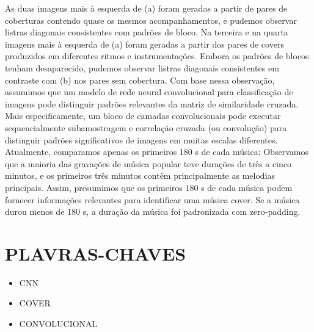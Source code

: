 \documentclass{article}
\begin{document}
As duas imagens mais à esquerda de (a) foram geradas a partir de pares de coberturas contendo quase os mesmos acompanhamentos, e pudemos observar listras diagonais consistentes com padrões de bloco. 
Na terceira e na quarta imagens mais à esquerda de (a) foram geradas a partir dos pares de covers produzidos em diferentes ritmos e instrumentações. 
Embora os padrões de blocos tenham desaparecido, pudemos observar listras diagonais consistentes em contraste com (b) nos pares sem cobertura. 
Com base nessa observação, assumimos que um modelo de rede neural convolucional para classificação de imagens pode distinguir padrões relevantes da matriz de similaridade cruzada. 
Mais especificamente, um bloco de camadas convolucionais pode executar sequencialmente subamostragem e correlação cruzada (ou convolução) para distinguir padrões significativos de imagens em muitas escalas diferentes. 
Atualmente, comparamos apenas os primeiros 180 s de cada música: Observamos que a maioria das gravações de música popular teve durações de três a cinco minutos, e os primeiros três minutos contêm principalmente as melodias principais. 
Assim, presumimos que os primeiros 180 s de cada música podem fornecer informações relevantes para identificar uma música cover. Se a música durou menos de 180 s, a duração da música foi padronizada com zero-padding.

\section{PLAVRAS-CHAVES}
\begin{itemize}
    \item CNN
    \item COVER
    \item CONVOLUCIONAL
\end{itemize}
\end{document}
